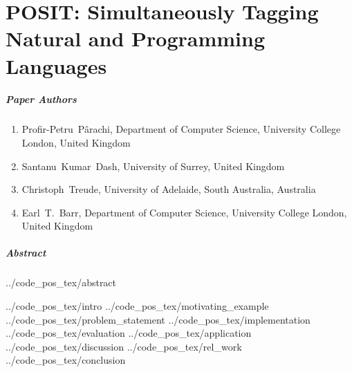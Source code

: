 \chapter{POSIT: Simultaneously Tagging Natural and Programming Languages}
\label{chapter:posit}

\renewcommand{\ourtool}{\textsc{POSIT}\xspace}
\renewcommand{\Ourtool}{\textsc{POSIT}\xspace}
\newcommand{\stormed}{StORMeD\xspace}
\newcommand{\SO}{Stack Overflow\xspace}
\newcommand{\projurl}{\url{https://github.com/PPPI/POSIT}\xspace}

\paragraph{Paper Authors}
\begin{enumerate}
    \item[] Profir-Petru~P\^arachi, Department of Computer Science, University College London, United Kingdom
    \item[] Santanu~Kumar~Dash, University of Surrey, United Kingdom
    \item[] Christoph~Treude, University of Adelaide, South Australia, Australia
    \item[] Earl~T.~Barr, Department of Computer Science, University College London, United Kingdom
\end{enumerate}

\paragraph{Abstract}
{../code_pos_tex/abstract}

{../code_pos_tex/intro}
{../code_pos_tex/motivating_example}
{../code_pos_tex/problem_statement}
{../code_pos_tex/implementation}
{../code_pos_tex/evaluation}
{../code_pos_tex/application}
{../code_pos_tex/discussion}
{../code_pos_tex/rel_work}
{../code_pos_tex/conclusion}
